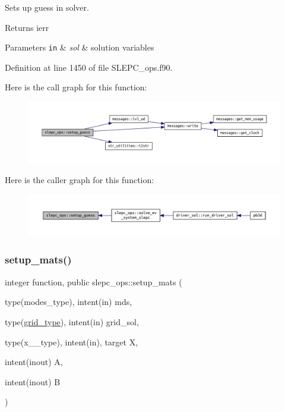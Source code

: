 Sets up guess in solver. 

\begin{DoxyReturn}{Returns}
ierr
\end{DoxyReturn}

\begin{DoxyParams}[1]{Parameters}
\mbox{\tt in}  & {\em sol} & solution variables \\
\hline
\end{DoxyParams}


Definition at line 1450 of file S\+L\+E\+P\+C\+\_\+ops.\+f90.

Here is the call graph for this function\+:\nopagebreak
\begin{figure}[H]
\begin{center}
\leavevmode
\includegraphics[width=350pt]{namespaceslepc__ops_a17a57b58ac6ca48ff4bdb44e8689bb19_cgraph}
\end{center}
\end{figure}
Here is the caller graph for this function\+:\nopagebreak
\begin{figure}[H]
\begin{center}
\leavevmode
\includegraphics[width=350pt]{namespaceslepc__ops_a17a57b58ac6ca48ff4bdb44e8689bb19_icgraph}
\end{center}
\end{figure}
\mbox{\label{namespaceslepc__ops_aac8202cb74cbb06013eb73f1fa0c3118}} 
\subsubsection{\texorpdfstring{setup\+\_\+mats()}{setup\_mats()}}
{\footnotesize\ttfamily integer function, public slepc\+\_\+ops\+::setup\+\_\+mats (\begin{DoxyParamCaption}\item[{type(modes\+\_\+type), intent(in)}]{mds,  }\item[{type(\hyperlink{structgrid__vars_1_1grid__type}{grid\+\_\+type}), intent(in)}]{grid\+\_\+sol,  }\item[{type(x\+\_\+2\+\_\+type), intent(in), target}]{X,  }\item[{intent(inout)}]{A,  }\item[{intent(inout)}]{B }\end{DoxyParamCaption})}



